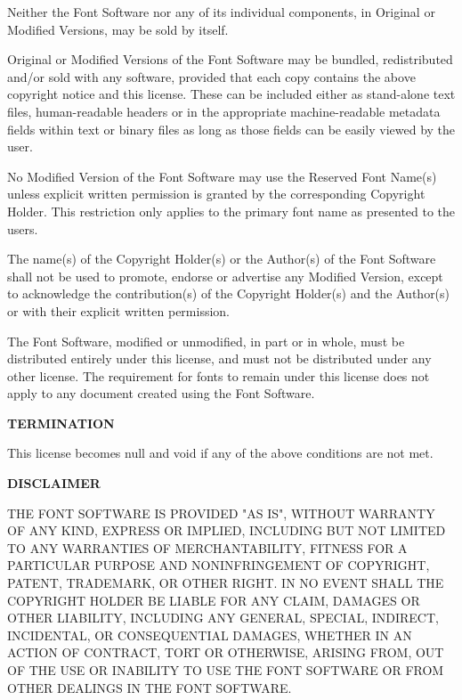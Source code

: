 \startitemize[n]
\item
Neither the Font Software nor any of its individual components, in Original or Modified Versions, may be sold by itself.

\item
Original or Modified Versions of the Font Software may be bundled, redistributed and/or sold with any software, provided that each copy contains the above copyright notice and this license. These can be included either as stand-alone text files, human-readable headers or in the appropriate machine-readable metadata fields within text or binary files as long as those fields can be easily viewed by the user.

\item
No Modified Version of the Font Software may use the Reserved Font Name(s) unless explicit written permission is granted by the corresponding Copyright Holder. This restriction only applies to the primary font name as presented to the users.

\item
The name(s) of the Copyright Holder(s) or the Author(s) of the Font Software shall not be used to promote, endorse or advertise any Modified Version, except to acknowledge the contribution(s) of the Copyright Holder(s) and the Author(s) or with their explicit written permission.

\item
The Font Software, modified or unmodified, in part or in whole, must be distributed entirely under this license, and must not be distributed under any other license. The requirement for fonts to remain under this license does not apply to any document created using the Font Software.
\stopitemize

{\bf TERMINATION}

This license becomes null and void if any of the above conditions are not met.

{\bf DISCLAIMER}

THE FONT SOFTWARE IS PROVIDED "AS IS", WITHOUT WARRANTY OF ANY KIND, EXPRESS OR IMPLIED, INCLUDING BUT NOT LIMITED TO ANY WARRANTIES OF MERCHANTABILITY, FITNESS FOR A PARTICULAR PURPOSE AND NONINFRINGEMENT OF COPYRIGHT, PATENT, TRADEMARK, OR OTHER RIGHT. IN NO EVENT SHALL THE COPYRIGHT HOLDER BE LIABLE FOR ANY CLAIM, DAMAGES OR OTHER LIABILITY, INCLUDING ANY GENERAL, SPECIAL, INDIRECT, INCIDENTAL, OR CONSEQUENTIAL DAMAGES, WHETHER IN AN ACTION OF CONTRACT, TORT OR OTHERWISE, ARISING FROM, OUT OF THE USE OR INABILITY TO USE THE FONT SOFTWARE OR FROM OTHER DEALINGS IN THE FONT SOFTWARE.

